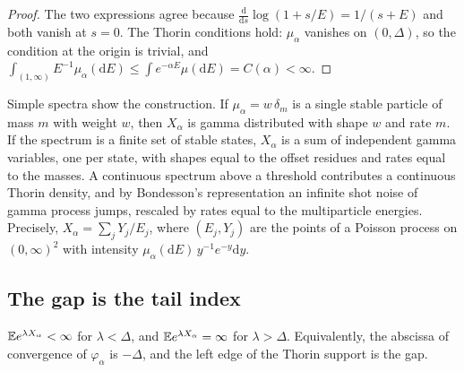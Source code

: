\begin{proof}
The two expressions agree because $\frac{\mathrm d}{\mathrm ds}\log(1+s/E)=1/(s+E)$ and both vanish at $s=0$. The Thorin conditions hold: $\mu_\alpha$ vanishes on $(0,\Delta)$, so the condition at the origin is trivial, and $\int_{(1,\infty)}E^{-1}\mu_\alpha(\mathrm dE)\le\int e^{-\alpha E}\mu(\mathrm dE)=C(\alpha)<\infty$.
\end{proof}

Simple spectra show the construction. If $\mu_\alpha=w\,\delta_m$ is a single stable particle of mass $m$ with weight $w$, then $X_\alpha$ is gamma distributed with shape $w$ and rate $m$. If the spectrum is a finite set of stable states, $X_\alpha$ is a sum of independent gamma variables, one per state, with shapes equal to the offset residues and rates equal to the masses. A continuous spectrum above a threshold contributes a continuous Thorin density, and by Bondesson's representation\cite{Bo92} an infinite shot noise of gamma process jumps, rescaled by rates equal to the multiparticle energies. Precisely, $X_\alpha=\sum_jY_j/E_j$, where $(E_j,Y_j)$ are the points of a Poisson process on $(0,\infty)^2$ with intensity $\mu_\alpha(\mathrm dE)\,y^{-1}e^{-y}\mathrm dy$.

\subsection{The gap is the tail index}

\begin{theorem}\label{thm:abscissaB}
$\mathbb{E} e^{\lambda X_\alpha}<\infty$ for $\lambda<\Delta$, and $\mathbb{E} e^{\lambda X_\alpha}=\infty$ for $\lambda>\Delta$. Equivalently, the abscissa of convergence of $\varphi_\alpha$ is $-\Delta$, and the left edge of the Thorin support is the gap.
\end{theorem}

